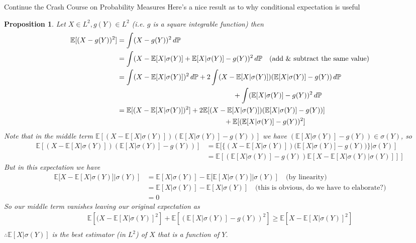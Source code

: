 \documentclass[12pt]{article}
\newtheorem{proposition}{Proposition}
\begin{document}
\begin{section}{Continue the Crash Course on Probability Measures}
\noindent Here's a nice result as to why conditional expectation is useful
\begin{proposition} Let $X \in L^2, g(Y) \in L^2$ (i.e. $g$ is a square integrable function) then
	\begin{align*}
		\mathbb E[(X - g(Y))^2] &= \int (X - g(Y))^2\,d\mathbb P \\
		&= \int (X - \mathbb E[X|\sigma(Y)] + \mathbb E[X|\sigma(Y)] - g(Y))^2\,d\mathbb P \quad \text{(add \& subtract the same value)} \\
		&= \int (X - \mathbb E[X|\sigma(Y)])^2\,d\mathbb P + 2\int (X - \mathbb E[X|\sigma(Y)])(\mathbb E[X|\sigma(Y)] - g(Y))\,d\mathbb P \\
		&\hphantom{{} = \int (X - \mathbb E[X|\sigma(Y)])^2\,d\mathbb P + 2\int (X - } + \int (\mathbb E[X|\sigma(Y)] - g(Y))^2\,d\mathbb P  \\
		&= \mathbb E[(X - \mathbb E[X|\sigma(Y)])^2]+ 2\mathbb E[(X - \mathbb E[X|\sigma(Y)])(\mathbb E[X|\sigma(Y)] - g(Y))] \\
		&\hphantom{{} = \mathbb E[(X - \mathbb E[X|\sigma(Y)])^2]+ 2\mathbb E[(X - } + \mathbb E[(\mathbb E[X|\sigma(Y)] - g(Y))^2] \\
	\end{align*}
Note that in the middle term $\mathbb E[(X - \mathbb E[X|\sigma(Y)])(\mathbb E[X|\sigma(Y)] - g(Y))]$ we have $(\mathbb E[X|\sigma(Y)] - g(Y)) \in \sigma(Y)$, so
	\begin{align*}
		\mathbb E[(X - \mathbb E[X|\sigma(Y)])(\mathbb E[X|\sigma(Y)] - g(Y))]  &= \mathbb E[\{(X - \mathbb E[X|\sigma(Y)])(\mathbb E[X|\sigma(Y)] - g(Y))\}|\sigma(Y)] \\
		&= \mathbb E[(\mathbb E[X|\sigma(Y)] - g(Y))\mathbb E[X - \mathbb E[X|\sigma(Y)|\sigma(Y)]]]
	\end{align*}
But in this expectation we have
	\begin{align*}
		\mathbb E[X - \mathbb E[X|\sigma(Y)]|\sigma(Y)] &= \mathbb E[X|\sigma(Y)] - \mathbb E[\mathbb E[X|\sigma(Y)]|\sigma(Y)] \quad \text{(by linearity)} \\
		&= \mathbb E[X|\sigma(Y)] - \mathbb E[X|\sigma(Y)] \quad \text{(this is obvious, do we have to elaborate?)} \\
		&= 0
	\end{align*}
So our middle term vanishes leaving our original expectation as
	\begin{align*}
		\mathbb E[(X - \mathbb E[X|\sigma(Y)]^2] + \mathbb E[(\mathbb E[X|\sigma(Y)] - g(Y))^2] \geq  \mathbb E[X - \mathbb E[X|\sigma(Y)]^2] \\
	\end{align*}
$\therefore \mathbb E[X|\sigma(Y)]$ is the best estimator (in $L^2$) of $X$ that is a function of $Y$.
\end{proposition}

\end{section}
\end{document}
